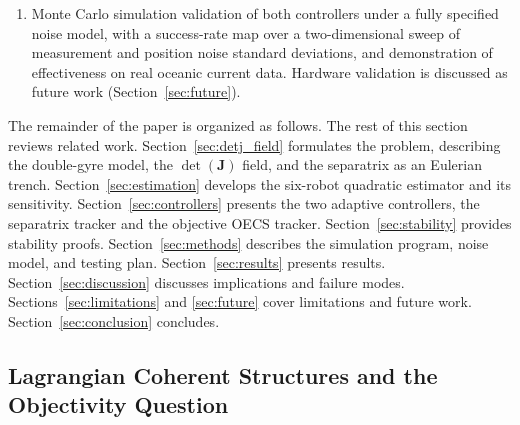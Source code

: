 \documentclass[lettersize,journal]{IEEEtran}
\begin{document}
\begin{enumerate}
          the Hessian of the smaller strain eigenvalue under any
          quadratic velocity fit is negative semidefinite, so a
          Newton-type trench snap is unavailable in principle and the
          tracker reads its frame from the strain eigenvectors instead;
          and a rotating-frame experiment demonstrating that the tracker
          recovers the same material structure in any observer frame,
          while the $\det(\mathbf{J})$ tracker follows a frame artifact.
    \item Monte Carlo simulation validation of both controllers under a fully
          specified noise model, with a success-rate map over a two-dimensional
          sweep of measurement and position noise standard deviations, and
          demonstration of effectiveness on real oceanic current data.
          Hardware validation is discussed as future work
          (Section~\ref{sec:future}).
\end{enumerate}

The remainder of the paper is organized as follows. The rest of this
section reviews related work. Section~\ref{sec:detj_field} formulates the
problem, describing the double-gyre model, the $\det(\mathbf{J})$ field, and
the separatrix as an Eulerian trench.
Section~\ref{sec:estimation} develops the six-robot quadratic estimator
and its sensitivity. Section~\ref{sec:controllers} presents the two
adaptive controllers, the separatrix tracker and the objective OECS
tracker.
Section~\ref{sec:stability} provides stability proofs.
Section~\ref{sec:methods} describes the simulation program, noise model, and
testing plan. Section~\ref{sec:results} presents results.
Section~\ref{sec:discussion} discusses implications and failure modes.
Sections~\ref{sec:limitations} and \ref{sec:future} cover limitations and
future work. Section~\ref{sec:conclusion} concludes.



\subsection{Lagrangian Coherent Structures and the Objectivity Question}
\end{document}
